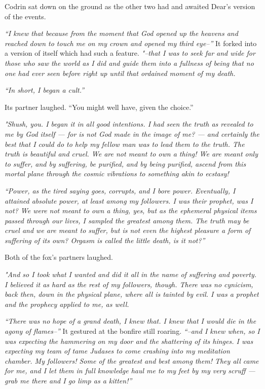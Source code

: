 Codrin sat down on the ground as the other two had and awaited Dear's version of the events.

\emph{``I knew that because from the moment that God opened up the heavens and reached down to touch me on my crown and opened my third eye--''} It forked into a version of itself which had such a feature. \emph{"--that I was to seek far and wide for those who saw the world as I did and guide them into a fullness of being that no one had ever seen before right up until that ordained moment of my death.}

\emph{``In short, I began a cult.''}

Its partner laughed. ``You might well have, given the choice.''

\emph{"Shush, you. I began it in all good intentions. I had seen the truth as revealed to me by God itself — for is not God made in the image of me? — and certainly the best that I could do to help my fellow man was to lead them to the truth. The truth is beautiful and cruel. We are not meant to own a thing! We are meant only to suffer, and by suffering, be purified, and by being purified, ascend from this mortal plane through the cosmic vibrations to something akin to ecstasy!}

\emph{``Power, as the tired saying goes, corrupts, and I bore power. Eventually, I attained absolute power, at least among my followers. I was their prophet, was I not? We were not meant to own a thing, yes, but as the ephemeral physical items passed through our lives, I sampled the greatest among them. The truth may be cruel and we are meant to suffer, but is not even the highest pleasure a form of suffering of its own? Orgasm is called the little death, is it not?''}

Both of the fox's partners laughed.

\emph{"And so I took what I wanted and did it all in the name of suffering and poverty. I believed it as hard as the rest of my followers, though. There was no cynicism, back then, down in the physical plane, where all is tainted by evil. I was a prophet and the prophecy applied to me, as well.}

\emph{``There was no hope of a grand death, I knew that. I knew that I would die in the agony of flames--''} It gestured at the bonfire still roaring. \emph{``--and I knew when, so I was expecting the hammering on my door and the shattering of its hinges. I was expecting my team of tame Judases to come crashing into my meditation chamber. My followers! Some of the greatest and best among them! They all came for me, and I let them in full knowledge haul me to my feet by my very scruff — grab me there and I go limp as a kitten!''}

